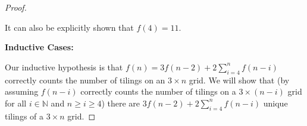 \documentclass{article}
\begin{document}
\begin{proof}
\begin{figure}[H]
        \begin{minipage}[t]{0.3\textwidth}
            \centering
            \setlength{\tabcolsep}{1pt}
            \renewcommand{\arraystretch}{0.7}
            \caption{}
            \label{figure2}
        \end{minipage}
        \hfill

        \begin{minipage}[t]{0.3\textwidth}
            \centering
            \setlength{\tabcolsep}{1pt}
            \renewcommand{\arraystretch}{0.7}
            \caption{}
            \label{figure3}
        \end{minipage}
    \end{figure}

    It can also be explicitly shown that $f(4) = 11$.

    \vspace{\baselineskip}
    \noindent \textbf{Inductive Cases:}
    \vspace{\baselineskip}
    
    Our inductive hypothesis is that $f(n) = 3f(n-2) + 2\sum_{i = 4}^{n}f(n-i)$ correctly counts the number of tilings on an $3 \times n$ grid. We will show that (by assuming $f(n-i)$ correctly counts the number of tilings on a $3 \times (n-i)$ grid for all $i \in \mathbb{N}$ and $n \geq i \geq 4$) there are $3f(n-2) + 2\sum_{i = 4}^{n}f(n-i)$ unique tilings of a $3 \times n$ grid.
    

\end{proof}
\end{document}
